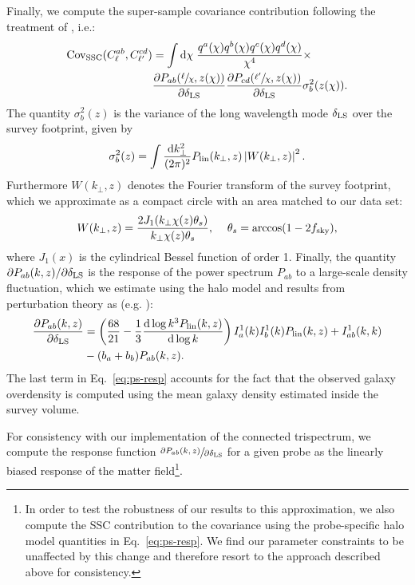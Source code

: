 \documentclass[a4paper,11pt]{article}
\begin{document}
    Finally, we compute the super-sample covariance contribution following the treatment of \cite{Krause:2017}, i.e.:
     \begin{equation}
    \begin{aligned}
       \mathrm{Cov}_{\mathrm{SSC}}(C^{ab}_{\ell}, C^{cd}_{\ell'}) &= \int \mathrm{d}\chi \;\frac{q^{a}(\chi)q^{b}(\chi)q^{c}(\chi)q^{d}(\chi)}{\chi^{4}} \times \\ &\frac{\partial P_{ab}(\sfrac{\ell}{\chi}, z(\chi))}{\partial \delta_{\rm LS}}\frac{\partial P_{cd}(\sfrac{\ell'}{\chi}, z(\chi))}{\partial \delta_{\rm LS}}\sigma^{2}_{b}(z(\chi)).
    \end{aligned}
    \end{equation}
        The quantity $\sigma_b^2(z)$ is the variance of the long wavelength mode $\delta_{\rm LS}$ over the survey footprint, given by
    \begin{equation}
      \sigma_b^2(z) = \int \frac{\mathrm{d}k_\perp^2}{(2\pi)^2}P_{\rm lin}(k_\perp,z)\left|W(k_\perp,z)\right|^2.
    \end{equation}
    Furthermore $W(k_\perp,z)$ denotes the Fourier transform of the survey footprint, which we approximate as a compact circle with an area matched to our data set:
    \begin{equation}
      W(k_\perp,z)=\frac{2 J_1(k_\perp\chi(z)\theta_s)}{k_\perp \chi(z)\theta_s},\hspace{12pt} \theta_s={\rm arccos}(1-2f_{\rm sky}),
    \end{equation}
    where $J_1(x)$ is the cylindrical Bessel function of order 1.
    Finally, the quantity $\partial P_{ab}(k, z)/\partial \delta_{\rm LS}$ is the response of the power spectrum $P_{ab}$ to a large-scale density fluctuation, which we estimate using the halo model and results from perturbation theory as (e.g. \cite{Krause:2017}):
    \begin{align}
      \frac{\partial P_{ab}(k, z)}{\partial \delta_{\rm LS}} &= \left( \frac{68}{21} - \frac{1}{3}\frac{\mathrm{d}\log{k^{3} P_{\mathrm{lin}}}(k, z)}{\mathrm{d}\log k} \right) I_{a}^{1}(k)I_{b}^{1}(k)P_{\mathrm{lin}}(k, z) + I_{ab}^{1}(k, k) \\ &- (b_{a} + b_{b})P_{ab}(k, z).
    \label{eq:ps-resp}  
    \end{align}
    The last term in Eq.~\ref{eq:ps-resp} accounts for the fact that the observed galaxy overdensity is computed using the mean galaxy density estimated inside the survey volume.
    
    For consistency with our implementation of the connected trispectrum, we compute the response function $\sfrac{\partial P_{ab}(k, z)}{\partial \delta_{\rm LS}} $ for a given probe as the linearly biased response of the matter field\footnote{In order to test the robustness of our results to this approximation, we also compute the SSC contribution to the covariance using the probe-specific halo model quantities in Eq.~\ref{eq:ps-resp}. We find our parameter constraints to be unaffected by this change and therefore resort to the approach described above for consistency.}. 
\end{document}
